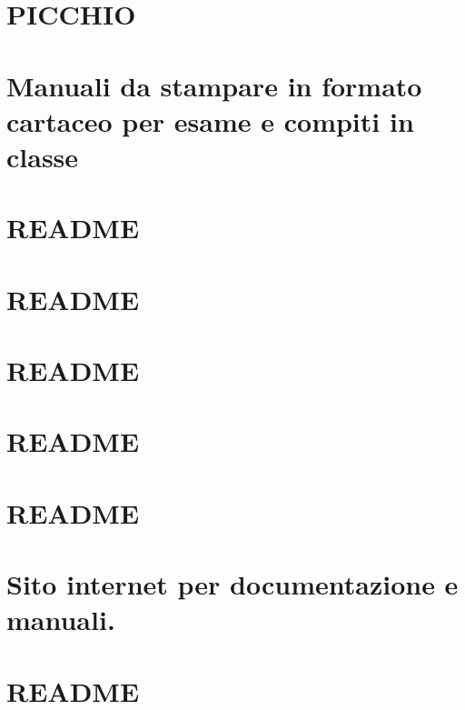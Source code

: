 \let\mypdfximage\pdfximage\def\pdfximage{\immediate\mypdfximage}\documentclass[twoside]{book}
\newcommand{\+}{\discretionary{\mbox{\scriptsize$\hookleftarrow$}}{}{}}
\begin{document}
\chapter{P\+I\+C\+C\+H\+IO}
\label{md_documenti_PICCHIO}

\chapter{Manuali da stampare in formato cartaceo per esame e compiti in classe}
\label{md_manuali_README}

\chapter{R\+E\+A\+D\+ME}
\label{md_manuali_sito_css_README}

\chapter{R\+E\+A\+D\+ME}
\label{md_manuali_sito_etc_README}

\chapter{R\+E\+A\+D\+ME}
\label{md_manuali_sito_images_README}

\chapter{R\+E\+A\+D\+ME}
\label{md_manuali_sito_js_README}

\chapter{R\+E\+A\+D\+ME}
\label{md_manuali_sito_lib_README}

\chapter{Sito internet per documentazione e manuali.}
\label{md_manuali_sito_README}

\chapter{R\+E\+A\+D\+ME}
\label{md_manuali_sito_sub_README}

\end{document}
